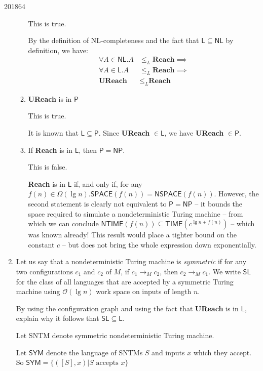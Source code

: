 \documentclass[10pt,\jkfside,a4paper]{article}
\begin{document}
\begin{examquestion}{2018}{6}{4}
\begin{enumerate}[label=(\alph*)]
\begin{enumerate}
This is true.

By the definition of NL-completeness and the fact that $\mathsf{L}\subseteq \mathsf{NL}$
by definition, we have:
\begin{align*}
\forall A \in \mathsf{NL}. A &\le_L \textbf{Reach} \implies\\
\forall A \in \mathsf{L}. A &\le_L \textbf{Reach} \implies\\
\textbf{UReach} &\le_L \textbf{Reach}
\end{align*}

\item \textbf{UReach} is in $\mathsf P$

This is true.

It is known that $\mathsf L \subseteq \mathsf P$. Since \textbf{UReach} $\in \mathsf L$,
we have \textbf{UReach} $\in \mathsf P$.

\item If \textbf{Reach} is in $\mathsf L$, then $\mathsf P = \mathsf{NP}$.

This is false.

\textbf{Reach} is in $\mathsf L$ if, and only if, for any $f(n) \in \Omega(\lg n).
\mathsf{SPACE}(f(n)) = \mathsf{NSPACE}(f(n))$. However, the second statement
is clearly not equivalent to $\mathsf{P} = \mathsf{NP}$ -- it bounds the
space required to simulate a nondeterministic Turing machine -- from which
we can conclude $\mathsf{NTIME}(f(n)) \subseteq \mathsf{TIME}(c^{\lg n + f(n
)})$ -- which was known already! This result would place a tighter bound on
the constant $c$ -- but does not bring the whole expression down exponentially.

\end{enumerate}

\item Let us say that a nondeterministic Turing machine is \textit{symmetric}
if for any two configurations $c_1$ and $c_2$ of $M$, if $c_1 \to_M c_2$,
then $c_2 \to_M c_1$. We write $\mathsf{SL}$ for the class of all languages
that are accepted by a symmetric Turing machine using $\mathcal O(\lg n)$
work space on inputs of length $n$.

By using the configuration graph and using the fact that \textbf{UReach} is
in $\mathsf L$, explain why it follows that $\mathsf{SL} \subseteq \mathsf L$.

Let SNTM denote symmetric nondeterministic Turing machine.

Let $\mathsf{SYM}$ denote the language of SNTMs $S$ and inputs $x$ which
they accept. So $\mathsf{SYM} = \{([S], x)|S \text{ accepts } x\}$


\end{enumerate}
\end{examquestion}
\end{document}

